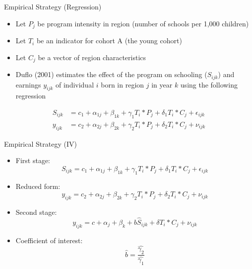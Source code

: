 \documentclass[11pt,notes=hide,aspectratio=169,mathserif]{beamer}
\begin{document}
\begin{frame}{Empirical Strategy (Regression)}
\begin{itemize}
    \item Let $P_j$ be program intensity in region (number of schools per 1,000 children)
    \item Let $T_i$ be an indicator for cohort A (the young cohort) 
    \item Let $C_j$ be a vector of region characteristics 
    \item Duflo (2001) estimates the effect of the program on schooling ($S_{ijk}$) and earnings $y_{ijk}$ of individual $i$ born in region $j$ in year $k$ using the following regression
\end{itemize}
\begin{align*}
    S_{ijk} &= c_1 + \alpha_{1j} + \beta_{1k} + \gamma_1 T_i * P_j + \delta_1 T_i * C_j + \epsilon_{ijk} \\
    y_{ijk} &= c_2 + \alpha_{2j} + \beta_{2k} + \gamma_2 T_i * P_j + \delta_2 T_i * C_j + \nu_{ijk}
\end{align*}
\end{frame}

\begin{frame}{Empirical Strategy (IV)}
\begin{itemize}
    \item First stage: 
    \begin{equation}
        S_{ijk} = c_1 + \alpha_{1j} + \beta_{1k} + \gamma_1 T_i * P_j + \delta_1 T_i * C_j + \epsilon_{ijk}
    \end{equation}
    \item Reduced form: 
    \begin{equation}
        y_{ijk} = c_2 + \alpha_{2j} + \beta_{2k} + \gamma_2 T_i * P_j + \delta_2 T_i * C_j + \nu_{ijk}
    \end{equation}
    \item Second stage:
    \begin{equation}
        y_{ijk} = c + \alpha_{j} + \beta_{k} + b \hat{S}_{ijk} + \delta T_i * C_j + \nu_{ijk}
    \end{equation}
    \item Coefficient of interest:
    \begin{equation}
        \hat{b} = \frac{\hat{\gamma_2}}{\hat{\gamma_1}}
    \end{equation}
\end{itemize}
\end{frame}
\end{document}
